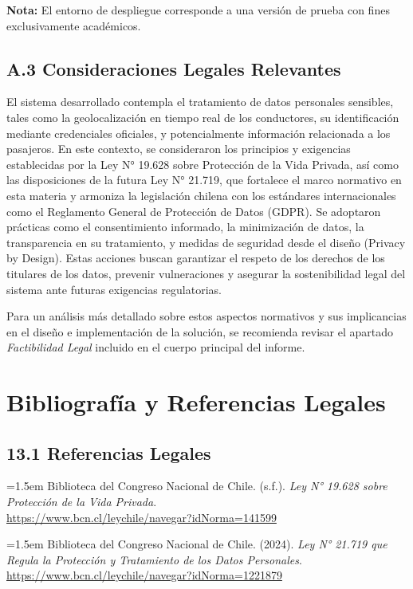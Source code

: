 \documentclass[12pt]{article}
\begin{document}
\textbf{Nota:} El entorno de despliegue corresponde a una versión de prueba con fines exclusivamente académicos.

\subsection*{A.3 Consideraciones Legales Relevantes}

El sistema desarrollado contempla el tratamiento de datos personales sensibles, tales como la geolocalización en tiempo real de los conductores, su identificación mediante credenciales oficiales, y potencialmente información relacionada a los pasajeros. En este contexto, se consideraron los principios y exigencias establecidas por la Ley N° 19.628 sobre Protección de la Vida Privada, así como las disposiciones de la futura Ley N° 21.719, que fortalece el marco normativo en esta materia y armoniza la legislación chilena con los estándares internacionales como el Reglamento General de Protección de Datos (GDPR). Se adoptaron prácticas como el consentimiento informado, la minimización de datos, la transparencia en su tratamiento, y medidas de seguridad desde el diseño (Privacy by Design). Estas acciones buscan garantizar el respeto de los derechos de los titulares de los datos, prevenir vulneraciones y asegurar la sostenibilidad legal del sistema ante futuras exigencias regulatorias.

Para un análisis más detallado sobre estos aspectos normativos y sus implicancias en el diseño e implementación de la solución, se recomienda revisar el apartado \emph{Factibilidad Legal} incluido en el cuerpo principal del informe.


\clearpage
\section{Bibliografía y Referencias Legales}
\renewcommand{\arraystretch}{1.3}
\setlength{\parskip}{0.5em} %

\subsection{13.1 \hspace{0.5em} Referencias Legales}
\hangindent=1.5em
Biblioteca del Congreso Nacional de Chile. (s.f.). \textit{Ley N° 19.628 sobre Protección de la Vida Privada}.\\
\url{https://www.bcn.cl/leychile/navegar?idNorma=141599}

\hangindent=1.5em
Biblioteca del Congreso Nacional de Chile. (2024). \textit{Ley N° 21.719 que Regula la Protección y Tratamiento de los Datos Personales}.\\
\url{https://www.bcn.cl/leychile/navegar?idNorma=1221879}
\end{document}
